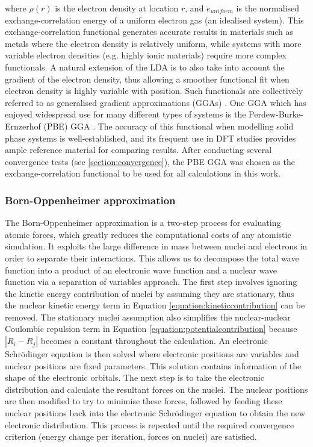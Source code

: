 where $\rho(r)$ is the electron density at location $r$, and $e_{uniform}$ is the normalised exchange-correlation energy of a uniform electron gas (an idealised system). This exchange-correlation functional generates accurate results in materials such as metals where the electron density is relatively uniform, while systems with more variable electron densities (e.g. highly ionic materials) require more complex functionals. A natural extension of the LDA is to also take into account the gradient of the electron density, thus allowing a smoother functional fit when electron density is highly variable with position. Such functionals are collectively referred to as generalised gradient approximations (GGAs) \cite{Langreth1980, Langreth1983, Becke1988, perdew2008restoring}. One GGA which has enjoyed widespread use for many different types of systems is the Perdew-Burke-Ernzerhof (PBE) GGA \cite{Perdew1996}. The accuracy of this functional when modelling solid phase systems is well-established, and its frequent use in DFT studies provides ample reference material for comparing results. After conducting several convergence tests (see \ref{section:convergence}), the PBE GGA was chosen as the exchange-correlation functional to be used for all calculations in this work.

\subsubsection{Born-Oppenheimer approximation}

The Born-Oppenheimer approximation is a two-step process for evaluating atomic forces, which greatly reduces the computational costs of any atomistic simulation. It exploits the large difference in mass between nuclei and electrons in order to separate their interactions. This allows us to decompose the total wave function into a product of an electronic wave function and a nuclear wave function via a separation of variables approach. The first step involves ignoring the kinetic energy contribution of nuclei by assuming they are stationary, thus the nuclear kinetic energy term in Equation \ref{equation:kineticcontribution} can be removed. The stationary nuclei assumption also simplifies the nuclear-nuclear Coulombic repulsion term in Equation \ref{equation:potentialcontribution} because $|R_i - R_j|$ becomes a constant throughout the calculation. An electronic Schr\"{o}dinger equation is then solved where electronic positions are variables and nuclear positions are fixed parameters. This solution contains information of the shape of the electronic orbitals. The next step is to take the electronic distribution and calculate the resultant forces on the nuclei. The nuclear positions are then modified to try to minimise these forces, followed by feeding these nuclear positions back into the electronic Schr\"{o}dinger equation to obtain the new electronic distribution. This process is repeated until the required convergence criterion (energy change per iteration, forces on nuclei) are satisfied.

